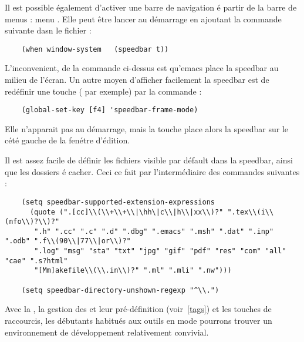 Il est possible \'egalement d'activer une barre de navigation \'e partir
de la barre de menus : menu . Elle
peut \^etre lancer au d\'emarrage en ajoutant la commande suivante dasn
le fichier  :
\begin{verbatim}
    (when window-system   (speedbar t))
\end{verbatim}
L'inconvenient, de la commande ci-dessus est qu'emacs place la speedbar au milieu de l'\'ecran. 
Un autre moyen d'afficher facilement la speedbar est de red\'efinir une touche ( par exemple) par la commande :
\begin{verbatim}
    (global-set-key [f4] 'speedbar-frame-mode)
\end{verbatim} 
Elle n'apparait pas au d\'emarrage, mais la touche  place alors la speedbar sur le c\'et\'e gauche de la fen\'etre d'\'edition.

Il est assez facile de d\'efinir les fichiers visible par d\'efault dans la speedbar, ainsi que les dossiers \'e cacher. Ceci ce fait par l'interm\'ediaire des commandes suivantes :

\begin{verbatim}
    (setq speedbar-supported-extension-expressions
      (quote (".[cc]\\(\\+\\+\\|\hh\|c\\|h\\|xx\\)?" ".tex\\(i\\(nfo\\)?\\)?"
       ".h" ".cc" ".c" ".d" ".dbg" ".emacs" ".msh" ".dat" ".inp" ".odb" ".f\\(90\\|77\\|or\\)?"
       ".log" "msg" "sta" "txt" "jpg" "gif" "pdf" "res" "com" "all" "cae" ".s?html"
       "[Mm]akefile\\(\\.in\\)?" ".ml" ".mli" ".nw")))

    (setq speedbar-directory-unshown-regexp "^\\.") 
\end{verbatim} 


Avec la , la gestion des  et leur
pr\'e-d\'efinition (voir~\ref{tags}) et les touches de raccourcis, les d\'ebutants habitu\'es aux outils en mode
  pourrons trouver un  environnement  de d\'eveloppement
relativement convivial.

